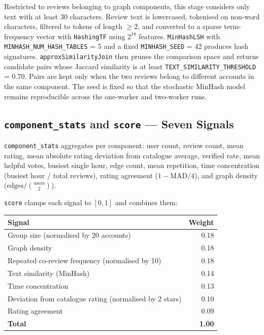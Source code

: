 \documentclass[12pt]{article}
\begin{document}
Restricted to reviews belonging to graph components, this stage considers
only text with at least 30 characters. Review text is lowercased, tokenised on
non-word characters, filtered to tokens of length $\geq 2$, and converted to a
sparse term-frequency vector with \texttt{HashingTF} using $2^{18}$ features.
\texttt{MinHashLSH} with \texttt{MINHASH\_NUM\_HASH\_TABLES} = 5 and a fixed
\texttt{MINHASH\_SEED} = 42 produces hash signatures.
\texttt{approxSimilarityJoin} then prunes the comparison space and returns
candidate pairs whose Jaccard similarity is at least
\texttt{TEXT\_SIMILARITY\_THRESHOLD} = 0.70. Pairs are kept only when the two
reviews belong to different accounts in the same component. The seed is fixed
so that the stochastic MinHash model remains reproducible across the
one-worker and two-worker runs.

\subsection{\texttt{component\_stats} and \texttt{score} --- Seven Signals}

\texttt{component\_stats} aggregates per component: user count, review count,
mean rating, mean absolute rating deviation from catalogue average, verified
rate, mean helpful votes, busiest single hour, edge count, mean repetition,
time concentration (busiest hour / total reviews), rating agreement
($1 - \mathrm{MAD}/4$), and graph density
($\mathrm{edges} / \binom{\mathrm{users}}{2}$).

\texttt{score} clamps each signal to $[0,1]$ and combines them:

\begin{center}
\begin{tabular}{@{}lr@{}}
  \toprule
  \textbf{Signal} & \textbf{Weight} \\
  \midrule
  Group size (normalised by 20 accounts)        & 0.18 \\
  Graph density                                  & 0.18 \\
  Repeated co-review frequency (normalised by 10) & 0.18 \\
  Text similarity (MinHash)                      & 0.14 \\
  Time concentration                             & 0.13 \\
  Deviation from catalogue rating (normalised by 2 stars) & 0.10 \\
  Rating agreement                               & 0.09 \\
  \midrule
  \textbf{Total}                                 & \textbf{1.00} \\
  \bottomrule
\end{tabular}
\end{center}
\end{document}
